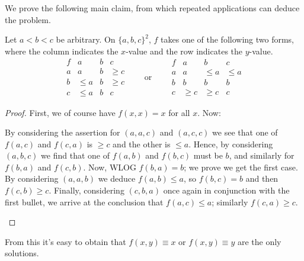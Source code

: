 \documentclass[11pt]{scrartcl}
\begin{document}
We prove the following main claim,
from which repeated applications can deduce the problem.

\begin{claim*}
  Let $a < b < c$ be arbitrary. On $\{a,b,c\}^2$,
  $f$ takes one of the following two forms,
  where the column indicates the $x$-value
  and the row indicates the $y$-value.
  \[
   \begin{array}{c|rrr}
    f & a & b & c \\ \hline
    a & a & b & \ge c \\
    b & \le a & b & \ge c \\
    c & \le a & b & c
   \end{array}
   \qquad
   \text{or}
   \qquad
   \begin{array}{c|rrr}
    f & a & b & c \\ \hline
    a & a & \le a & \le a \\
    b & b & b & b \\
    c & \ge c & \ge c & c
   \end{array}
  \]
\end{claim*}
\begin{proof}
  First, we of course have $f(x,x) = x$ for all $x$.
  Now:
  \begin{itemize}
  \ii By considering the assertion for $(a,a,c)$ and $(a,c,c)$
  we see that one of $f(a,c)$ and $f(c,a)$ is $\ge c$
  and the other is $\le a$.
  \ii Hence, by considering $(a,b,c)$ we find that
  one of $f(a,b)$ and $f(b,c)$ must be $b$,
  and similarly for $f(b,a)$ and $f(c,b)$.
  \ii Now, WLOG $f(b,a) = b$; we prove we get the first case.
  \ii By considering $(a,a,b)$ we deduce $f(a,b) \le a$,
  so $f(b,c) = b$ and then $f(c,b) \ge c$.
  \ii Finally, considering $(c,b,a)$ once again
  in conjunction with the first bullet, we arrive at the conclusion
  that $f(a,c) \le a$; similarly $f(c,a) \ge c$.
  \qedhere
  \end{itemize}
\end{proof}
From this it's easy to obtain that $f(x,y) \equiv x$
or $f(x,y) \equiv y$ are the only solutions.
\pagebreak
\end{document}
